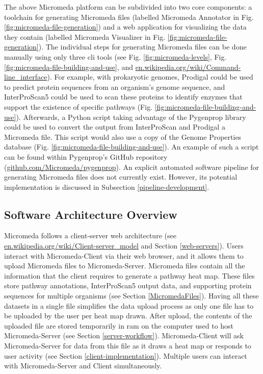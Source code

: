 The above Micromeda platform can be subdivided into two core components: a 
toolchain for generating Micromeda files (labelled Micromeda Annotator in Fig. 
\ref{fig:micromeda-file-generation}) and a web application for visualizing the 
data they contain (labelled Micromeda Visualizer in Fig. 
\ref{fig:micromeda-file-generation}). The individual steps for generating 
Micromeda files can be done manually using only three \gls{cli} tools (see Fig. 
\ref{fig:micromeda-levels}, Fig. \ref{fig:micromeda-file-building-and-use}, and  
\href{http://en.wikipedia.org/wiki/Command-line_interface}{en.wikipedia.org/wiki/Command-line\_interface}). 
For example, with prokaryotic genomes, Prodigal could be used to predict protein 
sequences from an organism's genome sequence, and InterProScan5 could be used to 
scan these proteins to identify enzymes that support the existence of specific 
pathways (Fig. \ref{fig:micromeda-file-building-and-use}). Afterwards, a Python 
script taking advantage of the Pygenprop library could be used to convert the 
output from InterProScan and Prodigal a Micromeda file. This script would also 
use a copy of the Genome Properties database (Fig. 
\ref{fig:micromeda-file-building-and-use}). An example of such a script can be 
found within Pygenprop's GitHub repository 
(\href{http://github.com/Micromeda/pygenprop}{github.com/Micromeda/pygenprop}). 
An explicit automated software pipeline for generating Micromeda files does not 
currently exist. However, its potential implementation is discussed in 
Subsection \ref{pipeline-development}.

\subsection{Software Architecture Overview}

Micromeda follows a client-server web architecture \cite{svobodova1985client} 
(see 
\href{http://en.wikipedia.org/wiki/Client-server_model}{en.wikipedia.org/wiki/Client-server\_model} 
and Section \ref{web-servers}). Users interact with Micromeda-Client via their 
web browser, and it allows them to upload Micromeda files to Micromeda-Server. 
Micromeda files contain all the information that the client requires to generate 
a pathway heat map. These files store pathway annotations, InterProScan5 output 
data, and supporting protein sequences for multiple organisms (see Section 
\ref{MicromedaFiles}). Having all these datasets in a single file simplifies the 
data upload process as only one file has to be uploaded by the user per heat map 
drawn. After upload, the contents of the uploaded file are stored temporarily in 
\gls{ram} on the computer used to host Micromeda-Server (see Section 
\ref{server-workflow}). Micromeda-Client will ask Micromeda-Server for data from 
this file as it draws a heat map or responds to user activity (see Section 
\ref{client-implementation}). Multiple users can interact with Micromeda-Server 
and Client simultaneously.

